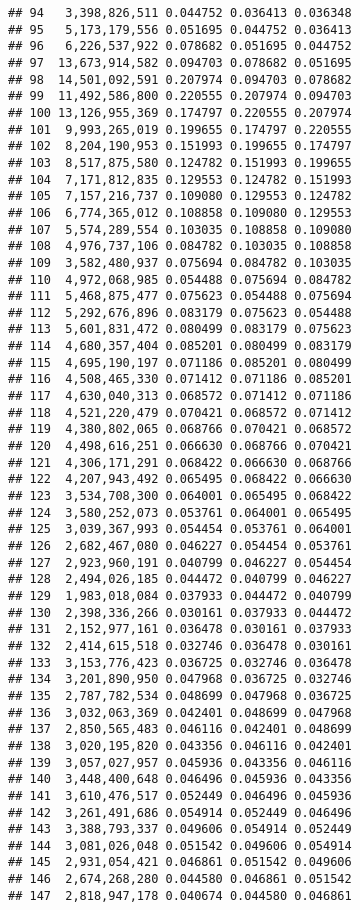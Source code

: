 \documentclass[]{article}
\begin{document}
\begin{verbatim}
## 94   3,398,826,511 0.044752 0.036413 0.036348
## 95   5,173,179,556 0.051695 0.044752 0.036413
## 96   6,226,537,922 0.078682 0.051695 0.044752
## 97  13,673,914,582 0.094703 0.078682 0.051695
## 98  14,501,092,591 0.207974 0.094703 0.078682
## 99  11,492,586,800 0.220555 0.207974 0.094703
## 100 13,126,955,369 0.174797 0.220555 0.207974
## 101  9,993,265,019 0.199655 0.174797 0.220555
## 102  8,204,190,953 0.151993 0.199655 0.174797
## 103  8,517,875,580 0.124782 0.151993 0.199655
## 104  7,171,812,835 0.129553 0.124782 0.151993
## 105  7,157,216,737 0.109080 0.129553 0.124782
## 106  6,774,365,012 0.108858 0.109080 0.129553
## 107  5,574,289,554 0.103035 0.108858 0.109080
## 108  4,976,737,106 0.084782 0.103035 0.108858
## 109  3,582,480,937 0.075694 0.084782 0.103035
## 110  4,972,068,985 0.054488 0.075694 0.084782
## 111  5,468,875,477 0.075623 0.054488 0.075694
## 112  5,292,676,896 0.083179 0.075623 0.054488
## 113  5,601,831,472 0.080499 0.083179 0.075623
## 114  4,680,357,404 0.085201 0.080499 0.083179
## 115  4,695,190,197 0.071186 0.085201 0.080499
## 116  4,508,465,330 0.071412 0.071186 0.085201
## 117  4,630,040,313 0.068572 0.071412 0.071186
## 118  4,521,220,479 0.070421 0.068572 0.071412
## 119  4,380,802,065 0.068766 0.070421 0.068572
## 120  4,498,616,251 0.066630 0.068766 0.070421
## 121  4,306,171,291 0.068422 0.066630 0.068766
## 122  4,207,943,492 0.065495 0.068422 0.066630
## 123  3,534,708,300 0.064001 0.065495 0.068422
## 124  3,580,252,073 0.053761 0.064001 0.065495
## 125  3,039,367,993 0.054454 0.053761 0.064001
## 126  2,682,467,080 0.046227 0.054454 0.053761
## 127  2,923,960,191 0.040799 0.046227 0.054454
## 128  2,494,026,185 0.044472 0.040799 0.046227
## 129  1,983,018,084 0.037933 0.044472 0.040799
## 130  2,398,336,266 0.030161 0.037933 0.044472
## 131  2,152,977,161 0.036478 0.030161 0.037933
## 132  2,414,615,518 0.032746 0.036478 0.030161
## 133  3,153,776,423 0.036725 0.032746 0.036478
## 134  3,201,890,950 0.047968 0.036725 0.032746
## 135  2,787,782,534 0.048699 0.047968 0.036725
## 136  3,032,063,369 0.042401 0.048699 0.047968
## 137  2,850,565,483 0.046116 0.042401 0.048699
## 138  3,020,195,820 0.043356 0.046116 0.042401
## 139  3,057,027,957 0.045936 0.043356 0.046116
## 140  3,448,400,648 0.046496 0.045936 0.043356
## 141  3,610,476,517 0.052449 0.046496 0.045936
## 142  3,261,491,686 0.054914 0.052449 0.046496
## 143  3,388,793,337 0.049606 0.054914 0.052449
## 144  3,081,026,048 0.051542 0.049606 0.054914
## 145  2,931,054,421 0.046861 0.051542 0.049606
## 146  2,674,268,280 0.044580 0.046861 0.051542
## 147  2,818,947,178 0.040674 0.044580 0.046861

\end{verbatim}
\end{document}
